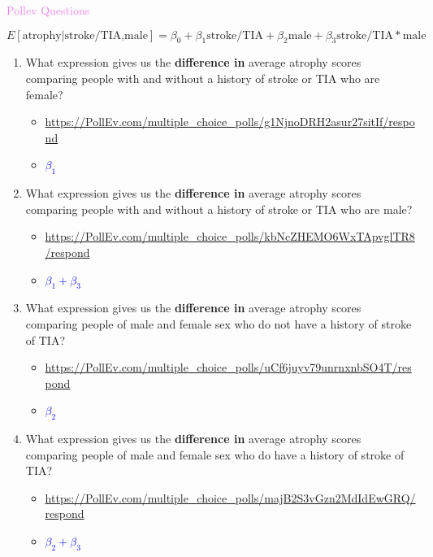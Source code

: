 \documentclass[10pt,t]{beamer}
\begin{document}
\begin{frame}{\textcolor{violet}{Pollev Questions}}
	
	\vspace{-13 mm}
	\small
	\[E[\text{atrophy}|\text{stroke/TIA,male}]=\beta_0+\beta_1\text{stroke/TIA}+\beta_2\text{male}+{\beta_3}\text{stroke/TIA}*\text{male}\]
	
	\normalsize
	\begin{enumerate}
		\item What expression gives us the \textbf{difference in} average atrophy scores comparing people with and without a history of stroke or TIA who are female?
		\begin{itemize}
	
			\item{\tiny\url{https://PollEv.com/multiple_choice_polls/g1NjnoDRH2asur27sitIf/respond}}\pause
			\item \textcolor{blue}{$\beta_1$}\pause
		\end{itemize}
	
		\item What expression gives us the \textbf{difference in} average atrophy scores comparing people with and without a history of stroke or TIA who are male?
		\begin{itemize}
			
			\item{\tiny\url{https://PollEv.com/multiple_choice_polls/kbNcZHEMO6WxTApvglTR8/respond}}\pause
			\item \textcolor{blue}{$\beta_1+\beta_3$}\pause
		\end{itemize}

		\item What expression gives us the \textbf{difference in} average atrophy scores comparing people of male and female sex who do not have a history of stroke of TIA?
		\begin{itemize}
			
			\item{\tiny\url{https://PollEv.com/multiple_choice_polls/uCf6juyv79unrnxnbSO4T/respond}}\pause
			\item \textcolor{blue}{$\beta_2$}\pause
		\end{itemize}
	
		\item What expression gives us the \textbf{difference in} average atrophy scores comparing people of male and female sex who do have a history of stroke of TIA?
		\begin{itemize}
			\smallskip
			\item{\tiny\url{https://PollEv.com/multiple_choice_polls/majB2S3vGzn2MdIdEwGRQ/respond}}\pause
			\item \textcolor{blue}{$\beta_2+\beta_3$}\pause
		\end{itemize}
	\end{enumerate}
	
	
\end{frame}
\end{document}
